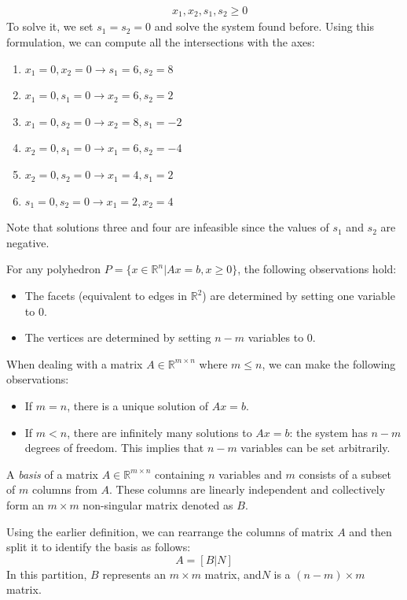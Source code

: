 \begin{example}
\begin{align*}
                                    &\: x_1,x_2,s_1,s_2 \geq 0
    \end{align*}
    To solve it, we set $s_1=s_2=0$ and solve the system found before.
    Using this formulation, we can compute all the intersections with the axes:
    \begin{enumerate}
        \item $x_1=0,x_2=0 \rightarrow s_1=6,s_2=8$
        \item $x_1=0,s_1=0 \rightarrow x_2=6,s_2=2$
        \item $x_1=0,s_2=0 \rightarrow x_2=8,s_1=-2$
        \item $x_2=0,s_1=0 \rightarrow x_1=6,s_2=-4$
        \item $x_2=0,s_2=0 \rightarrow x_1=4,s_1=2$
        \item $s_1=0,s_2=0 \rightarrow x_1=2,x_2=4$
    \end{enumerate}
    Note that solutions three and four are infeasible since the values of $s_1$ and $s_2$ are negative. 
\end{example}
\begin{property}
    For any polyhedron $P = \{x \in \mathbb{R}^n|Ax = b,x \geq 0\}$, the following observations hold:
    \begin{itemize}
        \item The facets (equivalent to edges in $\mathbb{R}^2$) are determined by setting one variable to 0. 
        \item The vertices are determined by setting $n-m$ variables to 0. 
    \end{itemize}
\end{property}
When dealing with a matrix  $A \in \mathbb{R}^{m \times n}$ where $m \leq n$, we can make the following observations:
\begin{itemize}
    \item If $m=n$, there is a unique solution of $Ax = b$.
    \item If $m<n$, there are infinitely many solutions to  $Ax = b$: the system has $n-m$ degrees of freedom. 
        This implies that $n-m$ variables can be set arbitrarily. 
\end{itemize}
\begin{definition}
    A \emph{basis} of a matrix $A \in \mathbb{R}^{m \times n}$ containing  $n$ variables and $m$ consists of a subset of $m$ columns from $A$. 
    These columns are linearly independent and collectively form an $m \times m$ non-singular matrix denoted as $B$. 
\end{definition}
Using the earlier definition, we can rearrange the columns of matrix $A$ and then split it to identify the basis as follows:
\[A=\left[ B|N \right]\]
In this partition, $B$ represents an $m \times m$ matrix, and$N$ is a $(n-m) \times m$ matrix.

